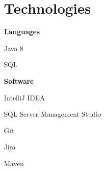 \documentclass[letterpaper,11pt]{article}
\begin{document}
\section{Technologies}
\textbf{Languages}
\hfill
\begin{itemize*}
	\item Java 8
	\item SQL
\end{itemize*}

\textbf{Software}
\hfill
\begin{itemize*}
	\item IntelliJ IDEA
	\item SQL Server Management Studio
	\item Git
	\item Jira
	\item Maven
\end{itemize*}

\end{document}
